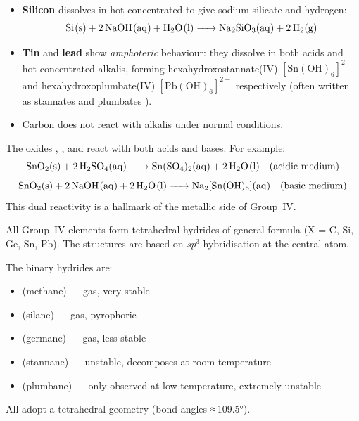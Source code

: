 \documentclass[11pt]{article}
\newcounter{popsec}
\newcounter{popsub}
\newcommand{\courssub}[1]{%
  \stepcounter{popsub}%
  \par\vspace{9pt}\noindent{\popxbold\fontsize{11.5}{13}\selectfont\color{popink}{\color{poporange}\thepopsec.\thepopsub}\hspace{6pt}#1}\par\nopagebreak\vspace{4pt}
}
\begin{document}
\begin{experience}
\begin{itemize}
\item \textbf{Silicon} dissolves in hot concentrated  to give sodium silicate and hydrogen:
\[
\ce{Si(s) + 2NaOH(aq) + H2O(l) -> Na2SiO3(aq) + 2H2(g)}
\]
\item \textbf{Tin} and \textbf{lead} show \emph{amphoteric} behaviour: they dissolve in both acids and hot concentrated alkalis, forming hexahydroxostannate(IV) \ensuremath{\mathrm{[Sn(OH)_{6}]^{2-}}} and hexahydroxoplumbate(IV) \ensuremath{\mathrm{[Pb(OH)_{6}]^{2-}}} respectively (often written as stannates  and plumbates ).
\item Carbon does not react with alkalis under normal conditions.
\end{itemize}
\end{experience}

\begin{propriete}
The oxides , ,  and  react with both acids and bases. For example:
\[
\ce{SnO2(s) + 2H2SO4(aq) -> Sn(SO4)2(aq) + 2H2O(l)} \quad\text{(acidic medium)}
\]
\[
\ce{SnO2(s) + 2NaOH(aq) + 2H2O(l) -> Na2[Sn(OH)6](aq)} \quad\text{(basic medium)}
\]
This dual reactivity is a hallmark of the metallic side of Group~IV.
\end{propriete}

\courssub{Hydrides of Group IV}

All Group~IV elements form tetrahedral hydrides of general formula  (X = C, Si, Ge, Sn, Pb). The structures are based on \emph{sp$^{3}$} hybridisation at the central atom.

\begin{definition}
The binary hydrides are:
\begin{itemize}
\item {} (methane) — gas, very stable
\item {} (silane) — gas, pyrophoric
\item {} (germane) — gas, less stable
\item {} (stannane) — unstable, decomposes at room temperature
\item {} (plumbane) — only observed at low temperature, extremely unstable
\end{itemize}
All adopt a tetrahedral geometry (bond angles ≈ 109.5°).
\end{definition}
\end{document}
